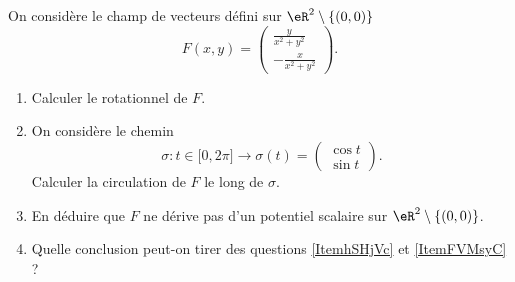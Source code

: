

\begin{exercice}\label{exoexamens-0004}

    On considère le champ de vecteurs défini sur \( \eR^2\setminus\{ (0,0) \}\)
    \begin{equation}
        F(x,y)=\begin{pmatrix}
            \frac{ y }{ x^2+y^2 }    \\ 
            -\frac{ x }{ x^2+y^2 }    
        \end{pmatrix}.
    \end{equation}
    \begin{enumerate}
        \item       \label{ItemhSHjVc}
            Calculer le rotationnel de \( F\).
        \item
            On considère le chemin
            \begin{equation}
                \sigma\colon t\in\mathopen[ 0 , 2\pi \mathclose]\to \sigma(t)=\begin{pmatrix}
                    \cos t    \\ 
                    \sin t    
                \end{pmatrix}.
            \end{equation}
            Calculer la circulation de \( F\) le long de \( \sigma\).
        \item       \label{ItemFVMsyC}
            En déduire que \( F\) ne dérive pas d'un potentiel scalaire sur \( \eR^2\setminus\{ (0,0) \}\).
        \item
            Quelle conclusion peut-on tirer des questions \ref{ItemhSHjVc} et \ref{ItemFVMsyC} ?
    \end{enumerate}
    

\end{exercice}
